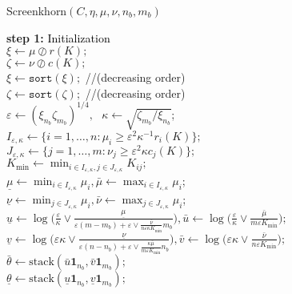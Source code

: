 \documentclass{article}
\newcommand{\R}{{\mathbb{R}}}
\begin{document}
\LinesNotNumbered
\begin{algorithm}[htbp]
\DontPrintSemicolon
\caption{Screenkhorn$(C,\eta,\mu,\nu,n_b,m_b)$}
\label{screenkhorn}

\textbf{step 1:} \textcolor{black}{Initialization}\\

\nl   $\xi \gets \mu \oslash r(K);$ \\
\nl   $\zeta \gets \nu \oslash c(K);$\\
\nl   $\xi \gets \texttt{sort}(\xi);$ //(decreasing order)\\
\nl   $\zeta \gets \texttt{sort}(\zeta);$ //(decreasing order)\\
\nl   $\varepsilon \gets (\xi_{n_b}\zeta_{m_b})^{1/4}, \text{  } \kappa \gets \sqrt{{\zeta_{m_b}}/{\xi_{n_b}}}$;\\
\nl   $I_{\varepsilon,\kappa} \gets \{i=1, \ldots, n: \mu_i \geq {\varepsilon^2} \kappa^{-1} r_i(K)\};$\\
\nl   $J_{\varepsilon,\kappa} \gets \{j=1, \ldots, m: \nu_j \geq \varepsilon^2\kappa c_j(K)\};$\\ 


\nl   $K_{\min} \gets \min_{i \in I_{\varepsilon,\kappa}, j \in J_{\varepsilon,\kappa}}K_{ij};$ \\
\nl   $\underline{\mu} \gets \min_{i \in I_{\varepsilon,\kappa}} \mu_i, \bar{\mu} \gets \max_{i \in I_{\varepsilon,\kappa}} \mu_i$; \\
\nl   $\underline{\nu} \gets \min_{j \in J_{\varepsilon,\kappa}} \mu_i, \bar{\nu} \gets \max_{j \in J_{\varepsilon,\kappa}} \mu_i$; \\
\nl   $\underline{u} \gets \log\big(\frac \varepsilon\kappa \vee \frac{\underline{\mu}}{\varepsilon (m-m_b) + \varepsilon \vee \frac{\bar{\nu}}{n\varepsilon\kappa K_{\min}} m_b}\big), \bar{u} \gets  \log\big(\frac \varepsilon\kappa\vee \frac{\bar{\mu}}{m\varepsilon K_{\min}}\big);$\\
\nl   $\underline{v} \gets \log\big(\varepsilon\kappa \vee \frac{\underline{\nu}}{\varepsilon(n-n_b) + \varepsilon \vee \frac{\kappa\bar{\mu}}{m\varepsilon K_{\min}} n_b}\big), \bar{v} \gets \log\big(\varepsilon\kappa \vee \frac{\bar{\nu}}{n\varepsilon K_{\min}}\big);$\\
\nl   $ \bar{\theta} \gets \text{stack}(\bar{u}\mathbf 1_{n_b}, \bar{v}\mathbf 1_{m_b});$\\
\nl   $ \underline{\theta} \gets \text{stack}(\underline{u}\mathbf 1_{n_b}, \underline{v}\mathbf 1_{m_b}) ;$\\ %


\end{algorithm}
\end{document}
